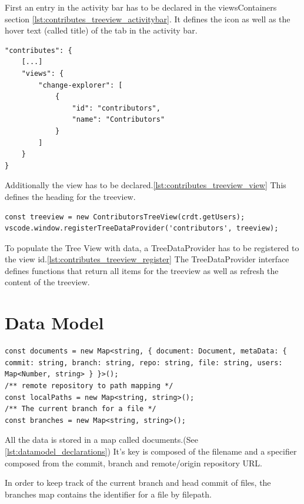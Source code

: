First an entry in the activity bar has to be declared in the viewsContainers section \ref{lst:contributes_treeview_activitybar}. It defines the icon as well as the hover text (called title) of the tab in the activity bar.

\begin{lstlisting}[label={lst:contributes_treeview_view}]
"contributes": {
    [...]
    "views": {
        "change-explorer": [
            {
                "id": "contributors",
                "name": "Contributors"
            }
        ]
    }
}
\end{lstlisting}

Additionally the view has to be declared.\ref{lst:contributes_treeview_view} This defines the heading for the treeview.

\begin{lstlisting}[label={lst:contributes_treeview_register} caption=Define Tree View Data Provider]
const treeview = new ContributorsTreeView(crdt.getUsers);
vscode.window.registerTreeDataProvider('contributors', treeview);
\end{lstlisting}

To populate the Tree View with data, a TreeDataProvider has to be registered to the view id.\ref{lst:contributes_treeview_register}
The TreeDataProvider interface defines functions that return all items for the treeview as well as refresh the content of the treeview.

\section{Data Model}

\begin{lstlisting}[label={lst:datamodel_declarations}, caption=data model declarations]
const documents = new Map<string, { document: Document, metaData: { commit: string, branch: string, repo: string, file: string, users: Map<Number, string> } }>();
/** remote repository to path mapping */
const localPaths = new Map<string, string>();
/** The current branch for a file */
const branches = new Map<string, string>();
\end{lstlisting}

All the data is stored in a map called documents.(See \ref{lst:datamodel_declarations})
It's key is composed of the filename and a specifier composed from the commit, branch and remote/origin repository URL.

In order to keep track of the current branch and head commit of files, the branches map contains the identifier for a file by filepath.

